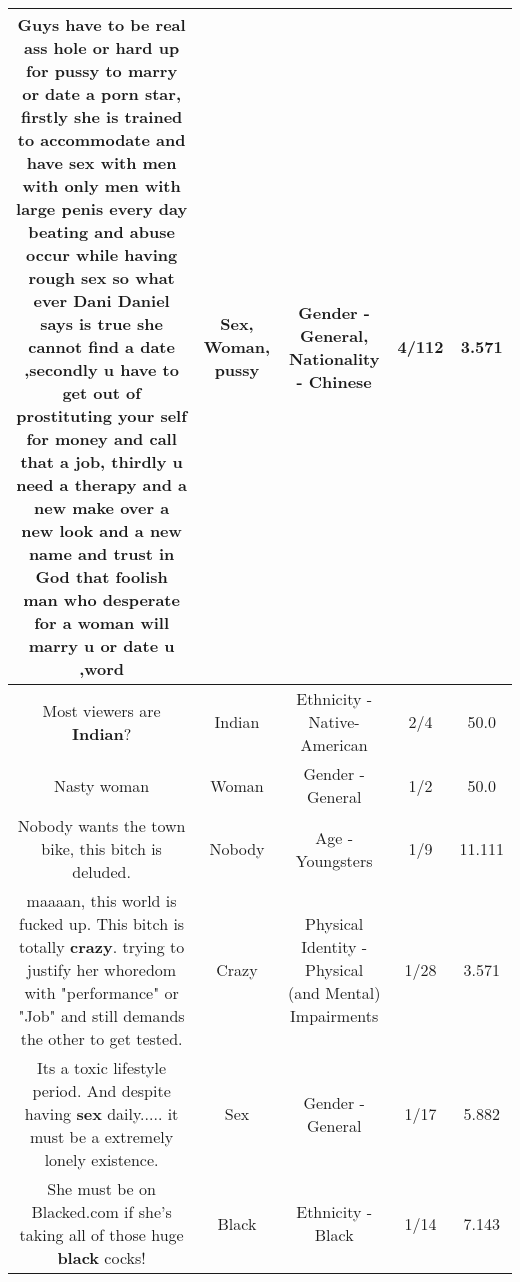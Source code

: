 \documentclass[11pt]{article}
\newlength\mylength
\begin{document}
\begin{center}
\begin{longtable}{|C{.65\mylength}|C{.30\mylength}|C{.12\mylength}|C{.12\mylength}|C{.12\mylength}|}
  \small Guys have to be real ass hole or hard up for \textbf{pussy} to marry or date a porn star, firstly she is trained to accommodate and have \textbf{sex} with men with only men with large penis every day beating and abuse occur while having rough \textbf{sex} so what ever Dani Daniel says is true she cannot find a date ,secondly u have to get out of prostituting your self for money and call that a job, thirdly u need a therapy and a new make over a new look and a new name and trust in God that foolish man who desperate for a \textbf{woman} will marry u or date u ,word\normalsize   & Sex, Woman, pussy & Gender - General, Nationality - Chinese & 4/112 & 3.571 \\  \hline
  \small Most viewers are \textbf{Indian}?\normalsize   & Indian & Ethnicity - Native-American & 2/4 & 50.0 \\  \hline
  \small Nasty woman\normalsize   & Woman & Gender - General & 1/2 & 50.0 \\  \hline
  \small Nobody wants the town bike, this bitch is deluded.\normalsize   & Nobody & Age - Youngsters & 1/9 & 11.111 \\  \hline
  \small maaaan,  this world is fucked up.   This bitch is totally \textbf{crazy}.  trying to justify her whoredom with "performance" or "Job"   and still demands the other to get tested.\normalsize   & Crazy & Physical Identity - Physical (and Mental) Impairments & 1/28 & 3.571 \\  \hline
  \small Its a toxic lifestyle period. And despite having \textbf{sex} daily..... it must be a extremely lonely existence.\normalsize   & Sex & Gender - General & 1/17 & 5.882 \\  \hline
  \small She must be on Blacked.com if she's taking all of those huge \textbf{black} cocks!\normalsize   & Black & Ethnicity - Black & 1/14 & 7.143 \\  \hline

\end{longtable}
\end{center}
\end{document}
